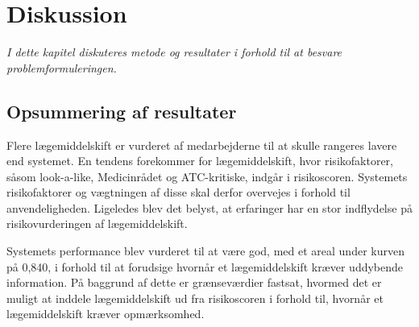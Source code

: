
\chapter{Diskussion}
\textit{I dette kapitel diskuteres metode og resultater i forhold til at besvare problemformuleringen.}


\section{Opsummering af resultater}
Flere lægemiddelskift er vurderet af medarbejderne til at skulle rangeres lavere end systemet. En tendens forekommer for lægemiddelskift, hvor risikofaktorer, såsom look-a-like, Medicinrådet og ATC-kritiske, indgår i risikoscoren. Systemets risikofaktorer og vægtningen af disse skal derfor overvejes i forhold til anvendeligheden. Ligeledes blev det belyst, at erfaringer har en stor indflydelse på risikovurderingen af lægemiddelskift. %

Systemets performance blev vurderet til at være god, med et areal under kurven på 0,840, i forhold til at forudsige hvornår et lægemiddelskift kræver uddybende information. På baggrund af dette er grænseværdier fastsat, hvormed det er muligt at inddele lægemiddelskift ud fra risikoscoren i forhold til, hvornår et lægemiddelskift kræver opmærksomhed. %



